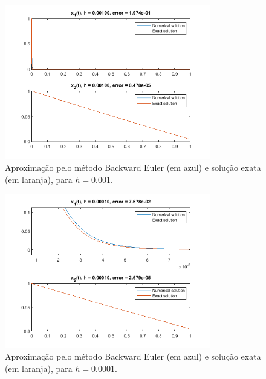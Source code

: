 \documentclass{article}
\begin{document}
\begin{enumerate}
\begin{enumerate}
                    \begin{figure}[!h]
                        \centering
                        \includegraphics[width=0.8\textwidth]{images/backward_3.png}
                        \caption{Aproximação pelo método Backward Euler (em azul) e
                        solução exata (em laranja), para $h = 0.001$.}
                        \label{fig:backward_3}
                    \end{figure}
                
                    \begin{figure}[!h]
                        \centering
                        \includegraphics[width=0.8\textwidth]{images/backward_4.png}
                        \caption{Aproximação pelo método Backward Euler (em azul) e
                        solução exata (em laranja), para $h = 0.0001$.}
                        \label{fig:backward_4}
                    \end{figure}

                    \clearpage


\end{enumerate}
\end{enumerate}
\end{document}
